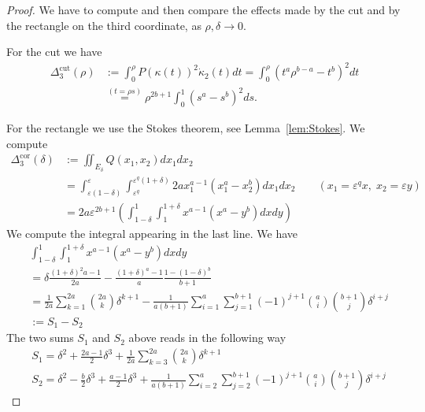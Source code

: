 \documentclass[10pt,a4paper]{amsart}
\newcommand{\De}{\Delta}
\newcommand{\cor}{\mathrm{cor}}
\newcommand{\cut}{\mathrm{cut}}
\newcommand{\de}{\delta}
\newcommand{\e}{\varepsilon}
\renewcommand{\k}{\kappa}
\begin{document}
\begin{proof}
	We have to compute and then compare the effects made by the cut and by the rectangle on the third coordinate, as $\rho,\de\to0$.
	
	For the cut we have
	\begin{equation}
		\label{eq:errk}
		\begin{split}
			\De^{\cut}_3(\rho)&:=\int_{0}^\rho P(\k(t))^2\dot\k_2(t)dt=\int_{0}^{\rho} (t^a\rho^{b-a}-t^b)^2dt\\
			&\stackrel{(t=\rho s)}{=}\rho^{2b+1}\int_{0}^{1} (s^a-s^b)^2ds.
		\end{split}
	\end{equation}

	For the rectangle we use the Stokes theorem, see Lemma~\ref{lem:Stokes}. We compute
	\begin{equation}
		\label{eq:errQ'}
		\begin{split}	
			\De_3^{\cor}(\de)&:=\iint_{E_\de} Q(x_1,x_2)dx_1dx_2\\
			&=\int_{\e(1-\de)}^\e\int_{\e^q}^{\e^q(1+\de)}2ax_1^{a-1}(x_1^a-x_2^b)dx_1dx_2 \qquad (x_1=\e^qx,\; x_2=\e y)\\
			&=2a\e^{2b+1}\left(\int_{1-\de}^1\int_{1}^{1+\de} x^{a-1}(x^a-y^b)dxdy\right)
		\end{split}
	\end{equation}
    We compute the integral appearing in the last line. We have
    \begin{equation}
        \label{eq:calcoloint1}
        \begin{split}
            &\int_{1-\de}^1\int_{1}^{1+\de} x^{a-1}(x^a-y^b)dxdy 
            \\
            &= \de\frac{(1+\de)^2a-1}{2a} - \frac{(1+\de)^a-1}{a}\frac{1-(1-\de)^b}{b+1}
            \\
            &=\frac{1}{2a} \sum_{k=1}^{2a}\binom{2a}{k}\de^{k+1} - 
            \frac{1}{a(b+1)} \sum_{i=1}^{a}\sum_{j=1}^{b+1}(-1)^{j+1}\binom{a}{i}\binom{b+1}{j}\de^{i+j}
            \\
            &:= S_1 - S_2
        \end{split}
    \end{equation}
    The two sums $S_1$ and $S_2$ above reads in the following way
    \begin{align}
        \label{eq:S1}&S_1 = \de^2 + \frac{2a-1}{2}\de^3 + \frac{1}{2a} \sum_{k=3}^{2a}\binom{2a}{k}\de^{k+1}
        \\
        \label{eq:S2}&S_2 = \de^2 - \frac b2\de^3 + \frac{a-1}{2} \de^3 + \frac{1}{a(b+1)} \sum_{i=2}^{a}\sum_{j=2}^{b+1}(-1)^{j+1}\binom{a}{i}\binom{b+1}{j}\de^{i+j}

\end{align}
\end{proof}
\end{document}
